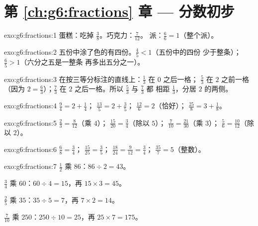 \section*{第 \ref{ch:g6:fractions} 章 --- 分数初步}

\begin{solution}{exo:g6:fractions:1}
蛋糕：吃掉 $\frac38$。\quad 巧克力：$\frac{7}{12}$。\quad
派：$\frac66 = 1$（整个派）。
\end{solution}

\begin{solution}{exo:g6:fractions:2}
五份中涂了色的有四份。$\frac45 < 1$（五份中的四份
少于整条）；$\frac65 > 1$（六分之五是一整条
再多出五分之一）。
\end{solution}

\begin{solution}{exo:g6:fractions:3}
在按三等分标注的直线上：$\frac13$ 在 $0$ 之后一格；
$\frac53$ 在 $2$ 之前一格（因为 $2 = \frac63$）；$\frac73$ 在
$2$ 之后一格。所以 $\frac53$ 与 $\frac73$ 都
相距 $\frac13$，分居 $2$ 的两侧。
\end{solution}

\begin{solution}{exo:g6:fractions:4}
$\frac94 = 2 + \frac14$；\quad
$\frac{13}{5} = 2 + \frac35$；\quad
$\frac{12}{6} = 2$（恰好）；\quad
$\frac{25}{8} = 3 + \frac18$。
\end{solution}

\begin{solution}{exo:g6:fractions:5}
$\frac23 = \frac{8}{12}$（乘 $4$）；\quad
$\frac{15}{20} = \frac34$（除以 $5$）；\quad
$\frac{7}{10} = \frac{21}{30}$（乘 $3$）；\quad
$\frac56 = \frac{10}{12}$（除以 $2$）。
\end{solution}

\begin{solution}{exo:g6:fractions:6}
$\frac68 = \frac34$；\quad
$\frac{15}{25} = \frac35$；\quad
$\frac{18}{24} = \frac{9}{12} = \frac34$；\quad
$\frac{35}{7} = 5$（整数）。
\end{solution}

\begin{solution}{exo:g6:fractions:7}
$\frac12$ 乘 $86$：$86 \div 2 = 43$。

$\frac34$ 乘 $60$：$60 \div 4 = 15$，再 $15 \times 3 = 45$。

$\frac25$ 乘 $35$：$35 \div 5 = 7$，再 $7 \times 2 = 14$。

$\frac{7}{10}$ 乘 $250$：$250 \div 10 = 25$，再 $25 \times 7 = 175$。
\end{solution}

